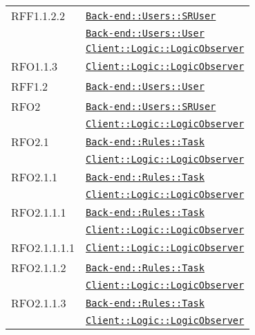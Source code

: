 \begin{longtable}{|>{\centering}m{3cm}|m{10cm}<{\centering}|}
RFF1.1.2.2 & \hyperref[Back-end::Users::SRUser]{\texttt{Back-end::Users::SRUser}}\\
& \hyperref[Back-end::Users::User]{\texttt{Back-end::Users::User}}\\
& \hyperref[Client::Logic::LogicObserver]{\texttt{Client::Logic::LogicObserver}}\\ \hline

RFO1.1.3 & \hyperref[Client::Logic::LogicObserver]{\texttt{Client::Logic::LogicObserver}}\\ \hline

RFF1.2 & \hyperref[Back-end::Users::User]{\texttt{Back-end::Users::User}}\\ \hline

RFO2 & \hyperref[Back-end::Users::SRUser]{\texttt{Back-end::Users::SRUser}}\\
& \hyperref[Client::Logic::LogicObserver]{\texttt{Client::Logic::LogicObserver}}\\ \hline

RFO2.1 & \hyperref[Back-end::Rules::Task]{\texttt{Back-end::Rules::Task}}\\
& \hyperref[Client::Logic::LogicObserver]{\texttt{Client::Logic::LogicObserver}}\\ \hline

RFO2.1.1 & \hyperref[Back-end::Rules::Task]{\texttt{Back-end::Rules::Task}}\\
& \hyperref[Client::Logic::LogicObserver]{\texttt{Client::Logic::LogicObserver}}\\ \hline

RFO2.1.1.1 & \hyperref[Back-end::Rules::Task]{\texttt{Back-end::Rules::Task}}\\
& \hyperref[Client::Logic::LogicObserver]{\texttt{Client::Logic::LogicObserver}}\\ \hline

RFO2.1.1.1.1 & \hyperref[Client::Logic::LogicObserver]{\texttt{Client::Logic::LogicObserver}}\\ \hline

RFO2.1.1.2 & \hyperref[Back-end::Rules::Task]{\texttt{Back-end::Rules::Task}}\\
& \hyperref[Client::Logic::LogicObserver]{\texttt{Client::Logic::LogicObserver}}\\ \hline

RFO2.1.1.3 & \hyperref[Back-end::Rules::Task]{\texttt{Back-end::Rules::Task}}\\
& \hyperref[Client::Logic::LogicObserver]{\texttt{Client::Logic::LogicObserver}}\\ \hline


\end{longtable}
